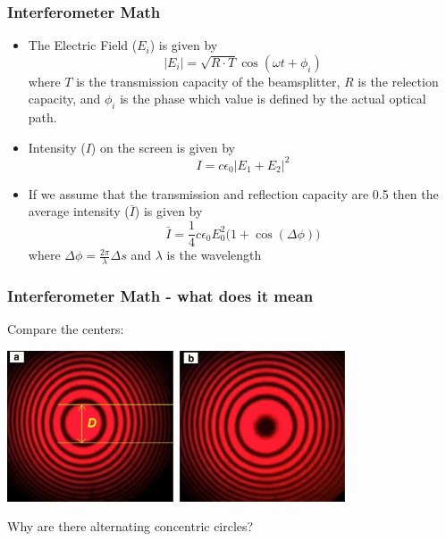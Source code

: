 \documentclass{beamer}
\begin{document}
\begin{frame}\frametitle{Interferometer Math}
\begin{itemize}
\item The Electric Field ($E_i$) is given by
\begin{equation}
\vert E_i \vert = \sqrt{R \cdot T} \cos{(\omega t + \phi_i)}
\end{equation}
where $T$ is the transmission capacity of the beamsplitter, $R$ is the relection capacity, and $\phi_i$ is the phase which value is defined by the actual optical path.
\item Intensity ($I$) on the screen is given by
\begin{equation}
I = c \epsilon_0 \vert E_1 + E_2 \vert^2
\end{equation}
\item If we assume that the transmission and reflection capacity are 0.5 then the average intensity ($\bar{I}$) is given by
\begin{equation}
\bar{I} = \frac{1}{4} c \epsilon_0 E_0^2 (1 + \cos{(\Delta \phi))}
\end{equation}
where $\Delta \phi = \frac{2 \pi}{\lambda} \Delta s$ and $\lambda$ is the wavelength
\end{itemize}
\end{frame}

\begin{frame}\frametitle{Interferometer Math - what does it mean}
Compare the centers:

\begin{center}
\includegraphics[width=10cm]{fig/fringe2.jpeg}
\end{center}

Why are there alternating concentric circles?
\end{frame}
\end{document}
